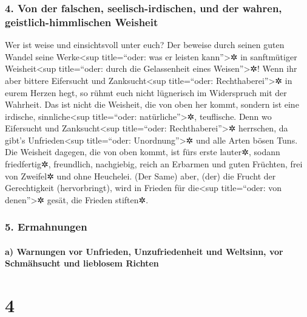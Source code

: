 \hypertarget{von-der-falschen-seelisch-irdischen-und-der-wahren-geistlich-himmlischen-weisheit}{%
\subsubsection{4. Von der falschen, seelisch-irdischen, und der wahren,
geistlich-himmlischen
Weisheit}\label{von-der-falschen-seelisch-irdischen-und-der-wahren-geistlich-himmlischen-weisheit}}

 Wer ist weise und einsichtsvoll unter euch? Der beweise
durch seinen guten Wandel seine Werke\textless sup title=``oder: was er
leisten kann''\textgreater✲ in sanftmütiger Weisheit\textless sup
title=``oder: durch die Gelassenheit eines Weisen''\textgreater✲!
 Wenn ihr aber bittere Eifersucht und
Zanksucht\textless sup title=``oder: Rechthaberei''\textgreater✲ in
eurem Herzen hegt, so rühmt euch nicht lügnerisch im Widerspruch mit der
Wahrheit.  Das ist nicht die Weisheit, die von oben her
kommt, sondern ist eine irdische, sinnliche\textless sup title=``oder:
natürliche''\textgreater✲, teuflische.  Denn wo
Eifersucht und Zanksucht\textless sup title=``oder:
Rechthaberei''\textgreater✲ herrschen, da gibt's Unfrieden\textless sup
title=``oder: Unordnung''\textgreater✲ und alle Arten bösen Tuns.
 Die Weisheit dagegen, die von oben kommt, ist fürs erste
lauter✲, sodann friedfertig✲, freundlich, nachgiebig, reich an Erbarmen
und guten Früchten, frei von Zweifel✲ und ohne Heuchelei.
 (Der Same) aber, (der) die Frucht der Gerechtigkeit
(hervorbringt), wird in Frieden für die\textless sup title=``oder: von
denen''\textgreater✲ gesät, die Frieden stiften✲.

\hypertarget{ermahnungen}{%
\subsubsection{5. Ermahnungen}\label{ermahnungen}}

\hypertarget{a-warnungen-vor-unfrieden-unzufriedenheit-und-weltsinn-vor-schmuxe4hsucht-und-lieblosem-richten}{%
\paragraph{a) Warnungen vor Unfrieden, Unzufriedenheit und Weltsinn, vor
Schmähsucht und lieblosem
Richten}\label{a-warnungen-vor-unfrieden-unzufriedenheit-und-weltsinn-vor-schmuxe4hsucht-und-lieblosem-richten}}

\hypertarget{section-3}{%
\section{4}\label{section-3}}


